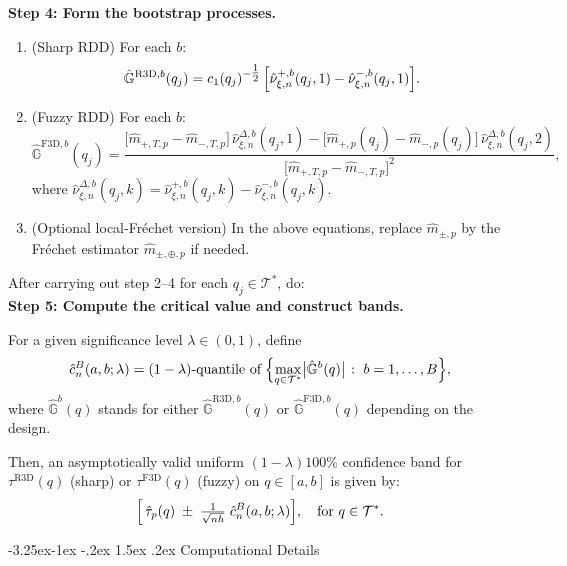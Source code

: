 \documentclass[12pt]{article}
\makeatletter
\renewcommand\subsection{\@startsection{subsection}{2}{\z@}%
  {-3.25ex\@plus -1ex \@minus -.2ex}%
  {1.5ex \@plus .2ex}%
  {\itshape\large\center}} %
\makeatother
\begin{document}
\smallskip
\noindent\textbf{Step 4: Form the bootstrap processes.}
\begin{enumerate}
  \item[(i)] (Sharp RDD) For each $b$:
  \[
    \hat{\mathbb{G}}^{\mathrm{R3D},b}(q_j)
    = 
    c_1(q_j)^{-\tfrac12}\,
    \Bigl[\hat{\nu}_{\xi,n}^{+,b}(q_j,1)
           -\hat{\nu}_{\xi,n}^{-,b}(q_j,1)\Bigr].
  \]
  \item[(ii)] (Fuzzy RDD) For each $b$:
  \[
    \hat{\mathbb{G}}^{\mathrm{F3D},b}(q_j)
    =
    \frac{
      \bigl[\hat{m}_{+,T,p}-\hat{m}_{-,T,p}\bigr]\,
           \hat{\nu}_{\xi,n}^{\Delta,b}(q_j,1)
      -
      \bigl[\hat{m}_{+,p}(q_j)-\hat{m}_{-,p}(q_j)\bigr]\,
           \hat{\nu}_{\xi,n}^{\Delta,b}(q_j,2)
    }{
      \bigl[\hat{m}_{+,T,p}-\hat{m}_{-,T,p}\bigr]^2
    },
  \]
  where 
  $
     \hat{\nu}_{\xi,n}^{\Delta,b}(q_j,k)
     =\hat{\nu}_{\xi,n}^{+,b}(q_j,k)-\hat{\nu}_{\xi,n}^{-,b}(q_j,k).
  $
  \item[(iii)] (Optional local‐Fr\'echet version) In the above equations, replace 
   $\hat{m}_{\pm,p}$
   by the Fr\'echet estimator $\hat{m}_{\pm,\oplus,p}$ if needed.
\end{enumerate}

\smallskip
After carrying out step 2--4 for each $q_j \in \mathcal{T}^*$, do: \\ 
\noindent\textbf{Step 5: Compute the critical value and construct bands.}

For a given significance level $\lambda\in(0,1)$, define 
\[
  \hat{c}_n^B(a,b;\lambda)
  =
  \text{$(1-\lambda)$‐quantile of}\;
  \Bigl\{
    \max_{q\in\mathcal{T}^*}\bigl|\hat{\mathbb{G}}^{b}(q)\bigr|
    \;\colon\;
    b=1,\dots,B
  \Bigr\},
\]
where $\hat{\mathbb{G}}^b(q)$ stands for either $\hat{\mathbb{G}}^{\mathrm{R3D},b}(q)$ or $\hat{\mathbb{G}}^{\mathrm{F3D},b}(q)$ depending on the design.

Then, an asymptotically valid uniform $(1-\lambda)100\%$ confidence band for 
\(\tau^{\mathrm{R3D}}(q)\) (sharp) or \(\tau^{\mathrm{F3D}}(q)\) (fuzzy) on \(q\in [a,b]\) is given by:
\[
  \Bigl[\,
    \hat{\tau}_p(q)\;\pm\;
    \tfrac{1}{\sqrt{nh}}\;
    \hat{c}_n^B(a,b;\lambda)
  \Bigr],
  \quad
  \text{for }q\in\mathcal{T}^*.
\]


\subsection{Computational Details}
\end{document}
